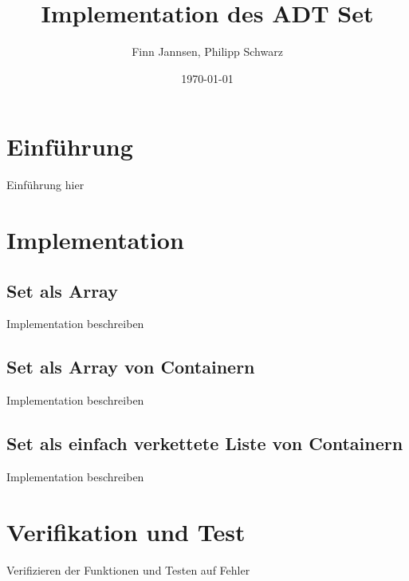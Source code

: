 \documentclass[11pt]{scrartcl}
\title{Implementation des ADT Set}
\author{Finn Jannsen, Philipp Schwarz}
\date{\today{}}
\begin{document}
\maketitle

\tableofcontents

\section{Einführung}
\label{sec:einfuehrung}

Einführung hier

\section{Implementation}
\label{sec:implementation}

\subsection{Set als Array}
\label{sec:setArray}

Implementation beschreiben

\subsection{Set als Array von Containern}
\label{sec:setConArray}

Implementation beschreiben

\subsection{Set als einfach verkettete Liste von Containern}
\label{sec:setCon}

Implementation beschreiben

\section{Verifikation und Test}
\label{sec:ver-test}

Verifizieren der Funktionen und Testen auf Fehler
\end{document}

